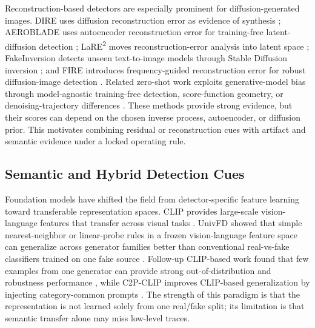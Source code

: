 \documentclass[letterpaper,journal]{IEEEtran}
\begin{document}
Reconstruction-based detectors are especially prominent for diffusion-generated images. DIRE uses diffusion reconstruction error as evidence of synthesis \cite{wang2023dire}; AEROBLADE uses autoencoder reconstruction error for training-free latent-diffusion detection \cite{ricker2024aeroblade}; LaRE\textsuperscript{2} moves reconstruction-error analysis into latent space \cite{luo2024lare2}; FakeInversion detects unseen text-to-image models through Stable Diffusion inversion \cite{cazenavette2024fakeinversion}; and FIRE introduces frequency-guided reconstruction error for robust diffusion-image detection \cite{chu2025fire}. Related zero-shot work exploits generative-model bias through model-agnostic training-free detection, score-function geometry, or denoising-trajectory differences \cite{he2024rigid,brokman2025manifold,liang2025trajectory}. These methods provide strong evidence, but their scores can depend on the chosen inverse process, autoencoder, or diffusion prior. This motivates combining residual or reconstruction cues with artifact and semantic evidence under a locked operating rule.

\subsection{Semantic and Hybrid Detection Cues}
Foundation models have shifted the field from detector-specific feature learning toward transferable representation spaces. CLIP provides large-scale vision-language features that transfer across visual tasks \cite{radford2021clip}. UnivFD showed that simple nearest-neighbor or linear-probe rules in a frozen vision-language feature space can generalize across generator families better than conventional real-vs-fake classifiers trained on one fake source \cite{ojha2023univfd}. Follow-up CLIP-based work found that few examples from one generator can provide strong out-of-distribution and robustness performance \cite{cozzolino2024clip}, while C2P-CLIP improves CLIP-based generalization by injecting category-common prompts \cite{tan2025c2pclip}. The strength of this paradigm is that the representation is not learned solely from one real/fake split; its limitation is that semantic transfer alone may miss low-level traces.
\end{document}
